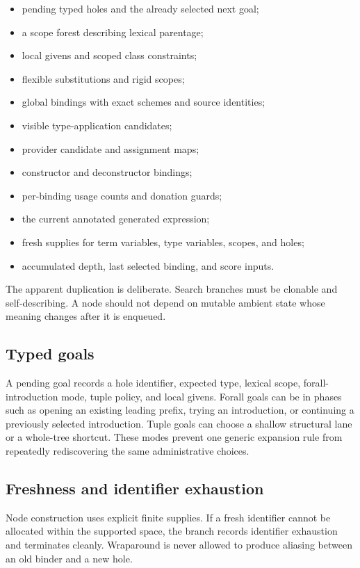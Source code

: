 \documentclass[10pt,letterpaper,oneside]{report}
\begin{document}
\begin{itemize}
  \item pending typed holes and the already selected next goal;
  \item a scope forest describing lexical parentage;
  \item local givens and scoped class constraints;
  \item flexible substitutions and rigid scopes;
  \item global bindings with exact schemes and source identities;
  \item visible type-application candidates;
  \item provider candidate and assignment maps;
  \item constructor and deconstructor bindings;
  \item per-binding usage counts and donation guards;
  \item the current annotated generated expression;
  \item fresh supplies for term variables, type variables, scopes, and holes;
  \item accumulated depth, last selected binding, and score inputs.
\end{itemize}

The apparent duplication is deliberate. Search branches must be clonable and self-describing. A node should not depend on mutable ambient state whose meaning changes after it is enqueued.

\subsection{Typed goals}

A pending goal records a hole identifier, expected type, lexical scope, forall-introduction mode, tuple policy, and local givens. Forall goals can be in phases such as opening an existing leading prefix, trying an introduction, or continuing a previously selected introduction. Tuple goals can choose a shallow structural lane or a whole-tree shortcut. These modes prevent one generic expansion rule from repeatedly rediscovering the same administrative choices.

\subsection{Freshness and identifier exhaustion}

Node construction uses explicit finite supplies. If a fresh identifier cannot be allocated within the supported space, the branch records identifier exhaustion and terminates cleanly. Wraparound is never allowed to produce aliasing between an old binder and a new hole.
\end{document}
